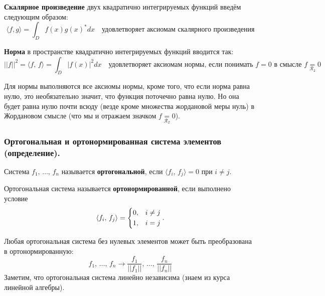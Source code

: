 \begin{definition*}
    \textbf{Скалярное произведение} двух квадратично интегрируемых функций введём следующим образом: 
    \[\langle f, g \rangle = \int_D f(x)g(x)^*dx \quad \text{удовлетворяет аксиомам скалярного произведения}\]
\end{definition*}

\begin{definition*}
    \textbf{Норма} в пространстве квадратично интегрируемых функций вводится так:
    \[\lvert \lvert f \rvert \rvert^2 = \langle f,\, f \rangle = \int_D \lvert f(x) \rvert^2 dx \quad \text{удовлетворяет аксиомам нормы, если понимать $f = 0$ в смысле $f \underset{\mathcal{R}_2}{=} 0$}\]
\end{definition*}
Для нормы выполняются все аксиомы нормы, кроме того, что если норма равна нулю, это необязательно значит, что функция поточечно равна нулю. Но она будет равна нулю почти всюду (везде кроме множества жордановой меры нуль) в Жордановом смысле (что мы и отражаем значком $f \underset{\mathcal{R}_2}{=} 0$).

\subsubsection{Ортогональная и ортонормированная система элементов (определение).}
\begin{definition*}
    Система $f_1,\, \ldots,\, f_n$ называется \textbf{ортогональной}, если $\langle f_i,\, f_j \rangle = 0$ при $i \neq j$.    
\end{definition*}
\begin{definition*}
    Ортогональная система называется \textbf{ортонормированной}, если выполнено условие 
    \[\langle f_i,\, f_j \rangle = \begin{dcases}
        0, &i \neq j \\
        1, &i = j
    \end{dcases}.\]
\end{definition*}

Любая ортогональная система без нулевых элементов может быть преобразована в ортонормированную:
\[f_1,\, \ldots,\, f_n \to \frac{f_1}{\lvert\lvert f_1 \rvert \rvert},\, \ldots,\, \frac{f_n}{\lvert\lvert f_n \rvert \rvert}\]
Заметим, что ортогональная система линейно независима (знаем из курса линейной алгебры).

